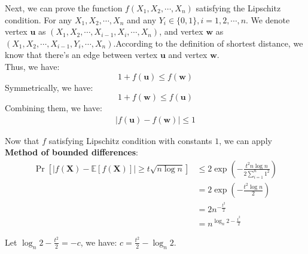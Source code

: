 \documentclass[a4paper, 12pt, titlepage]{article}
\begin{document}
Next, we can prove the function $f(X_{1}, X_{2}, \cdots, X_{n})$ satisfying the Lipschitz condition. For any $X_{1}, X_{2}, \cdots, X_{n}$ and any $Y_{i} \in \{ 0, 1 \}, i = 1, 2, \cdots, n$.
We denote vertex $\mathbf{u}$ as $(X_{1}, X_{2}, \cdots, X_{i - 1}, X_{i}, \cdots, X_{n})$, and vertex $\mathbf{w}$ as \\$(X_{1}, X_{2}, \cdots, X_{i - 1}, Y_{i}, \cdots, X_{n})$.According to
the definition of shortest distance, we know that there's an edge between vertex $\mathbf{u}$ and vertex $\mathbf{w}$.\\ Thus, we have:
\[
    1 + f(\mathbf{u}) \leq f(\mathbf{w}) 
\]
Symmetrically, we have:
\[
    1 + f(\mathbf{w}) \leq f(\mathbf{u})  
\]
Combining them, we have:
\begin{equation}
    \begin{aligned}
        | f(\mathbf{u}) - f(\mathbf{w}) | \leq 1
    \end{aligned}
\end{equation}

Now that $f$ satisfying Lipschitz condition with constants $1$, we can apply \textbf{Method of bounded differences}:
\begin{equation}
    \begin{aligned}
        \Pr \left[| f(\mathbf{X}) - \mathbb E \left[ f(\mathbf{X}) \right] | \geq t \sqrt{n \log{n}} \right] &\leq 2 \exp \left( - \frac{t^2 n \log{n}}{2 \sum_{i = 1}^{n} 1^2}\right) \\
                                                                                                             &= 2 \exp \left( - \frac{t^2 \log{n}}{2} \right) \\
                                                                                                             &= 2 n^{- \frac{t^2}{2} } \\
                                                                                                             &= n^{ \log_{n}{2} - \frac{t^2}{2}}           
    \end{aligned}
\end{equation}

Let $ \log_{n}{2} - \frac{t^2}{2} = -c$, we have: $c = \frac{t^2}{2} - \log_{n}{2}$.
\end{document}
